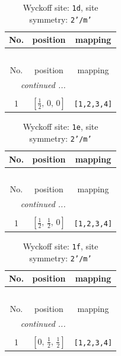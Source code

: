 \documentclass[fleqn,8pt]{jsarticle}
\begin{document}
\renewcommand{\arraystretch}{1.2}
\begin{longtable}{ccc}
\caption{Wyckoff site: {\tt 1d}, site symmetry: {\tt 2'/m'}}
 \\
 \hline \hline
No. & position & mapping \\ \hline \endfirsthead

\multicolumn{2}{l}{\tablename\ \thetable{}} \\
 \hline \hline
No. & position & mapping \\ \hline \endhead

 \hline \hline
\multicolumn{2}{r}{\footnotesize\it continued ...} \\ \endfoot

 \hline \hline
\multicolumn{2}{r}{} \\ \endlastfoot

1 & $\left[ \frac{1}{2},\, 0,\, 0 \right]$ & {\tt [1,2,3,4]} \\
\end{longtable}
\renewcommand{\arraystretch}{1.2}
\begin{longtable}{ccc}
\caption{Wyckoff site: {\tt 1e}, site symmetry: {\tt 2'/m'}}
 \\
 \hline \hline
No. & position & mapping \\ \hline \endfirsthead

\multicolumn{2}{l}{\tablename\ \thetable{}} \\
 \hline \hline
No. & position & mapping \\ \hline \endhead

 \hline \hline
\multicolumn{2}{r}{\footnotesize\it continued ...} \\ \endfoot

 \hline \hline
\multicolumn{2}{r}{} \\ \endlastfoot

1 & $\left[ \frac{1}{2},\, \frac{1}{2},\, 0 \right]$ & {\tt [1,2,3,4]} \\
\end{longtable}
\renewcommand{\arraystretch}{1.2}
\begin{longtable}{ccc}
\caption{Wyckoff site: {\tt 1f}, site symmetry: {\tt 2'/m'}}
 \\
 \hline \hline
No. & position & mapping \\ \hline \endfirsthead

\multicolumn{2}{l}{\tablename\ \thetable{}} \\
 \hline \hline
No. & position & mapping \\ \hline \endhead

 \hline \hline
\multicolumn{2}{r}{\footnotesize\it continued ...} \\ \endfoot

 \hline \hline
\multicolumn{2}{r}{} \\ \endlastfoot

1 & $\left[ 0,\, \frac{1}{2},\, \frac{1}{2} \right]$ & {\tt [1,2,3,4]} \\
\end{longtable}
\end{document}

